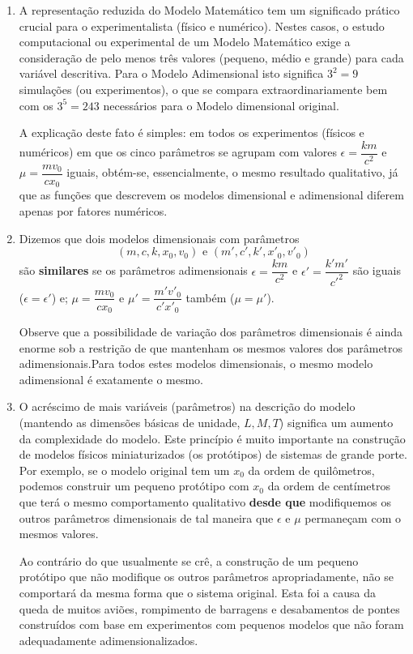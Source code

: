    \begin{enumerate}
    \item A representação reduzida do Modelo Matemático tem um significado prático crucial para o experimentalista (físico e numérico). Nestes casos, o estudo computacional ou experimental de um Modelo Matemático exige a consideração de pelo menos três valores (pequeno, médio e grande) para cada variável descritiva. Para o Modelo Adimensional isto significa \(3^2 = 9\) simulações (ou experimentos), o que se compara extraordinariamente bem com os \(3^5 = 243\) necessários para o Modelo dimensional original.

    A explicação deste fato é simples: em todos os experimentos (físicos e numéricos) em que os cinco parâmetros se agrupam com valores \(\epsilon = \dfrac{km}{c^2}\) e \(\mu = \dfrac{mv_0}{cx_0}\) iguais, obtém-se, essencialmente, o mesmo resultado qualitativo, já que as funções que descrevem os modelos dimensional e adimensional diferem apenas por fatores numéricos.

    \item Dizemos que dois modelos dimensionais com parâmetros \[(m, c, k, x_0, v_0) \mbox{ e } (m', c', k', x'_0, v'_0)\] são \textbf{similares} se os parâmetros adimensionais \(\epsilon = \dfrac{km}{c^2}\) e \(\epsilon' = \dfrac{k'm'}{c'^2}\) são iguais (\(\epsilon = \epsilon'\)) e; \(\mu = \dfrac{mv_0}{cx_0}\) e \(\mu' = \dfrac{m'v'_0}{c'x'_0}\) também (\(\mu = \mu'\)).

    Observe que a possibilidade de variação dos parâmetros dimensionais é ainda enorme sob a restrição de que mantenham os mesmos valores dos parâmetros adimensionais.Para todos estes modelos dimensionais, o mesmo modelo adimensional é exatamente o mesmo.

    \item O acréscimo de mais variáveis (parâmetros) na descrição do modelo (mantendo as dimensões básicas de unidade, \(L, M, T\)) significa um aumento da complexidade do modelo. Este princípio é muito importante na construção de modelos físicos miniaturizados (os protótipos) de sistemas de grande porte. Por exemplo, se o modelo original tem um \(x_0\) da ordem de quilômetros, podemos construir um pequeno protótipo com \(x_0\) da ordem de centímetros que terá o mesmo comportamento qualitativo \textbf{desde que} modifiquemos os outros parâmetros dimensionais de tal maneira que \(\epsilon\) e \(\mu\) permaneçam com o mesmos valores.

    Ao contrário do que usualmente se crê, a construção de um pequeno protótipo que não modifique os outros parâmetros apropriadamente, não se comportará da mesma forma que o sistema original. Esta foi a causa da queda de muitos aviões, rompimento de barragens e desabamentos de pontes construídos com base em experimentos com pequenos modelos que não foram adequadamente adimensionalizados.
\end{enumerate}



